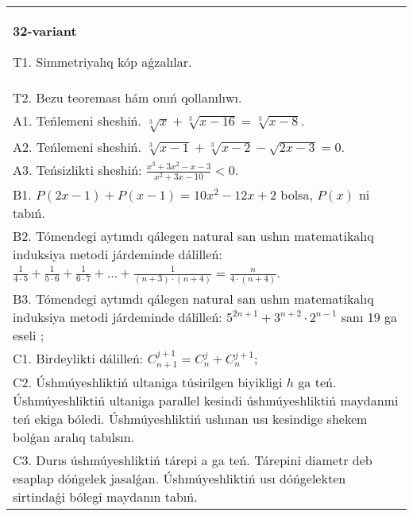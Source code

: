 \documentclass{article}
\begin{document}
\begin{tabular}{m{17cm}}
\textbf{32-variant}
\newline

T1. Simmetriyalıq kóp aǵzalılar. \\
T2. Bezu teoreması hám onıń qollanılıwı. \\
A1. Teńlemeni sheshiń. \(\sqrt[3]{x} + \sqrt[3]{x - 16} = \sqrt[3]{x - 8}\). \\
A2. Teńlemeni sheshiń. \(\sqrt[3]{x - 1} + \sqrt[3]{x - 2} - \sqrt{2x - 3} = 0\). \\
A3. Teńsizlikti sheshiń: \(\frac{x^{3} + 3x^{2} - x - 3}{x^{2} + 3x - 10} < 0\). \\
B1. \(P(2x - 1) + P(x - 1) = 10x^{2} - 12x + 2\) bolsa, \(P(x)\) ni tabıń. \\
B2. Tómendegi aytımdı qálegen natural san ushın matematikalıq induksiya metodi járdeminde dálilleń: \(\frac{1}{4 \cdot 5} + \frac{1}{5 \cdot 6} + \frac{1}{6 \cdot 7} + \ldots + \frac{1}{(n + 3) \cdot (n + 4)} = \frac{n}{4 \cdot (n + 4)}\). \\
B3. Tómendegi aytımdı qálegen natural san ushın matematikalıq induksiya metodi járdeminde dálilleń: \(5^{2n + 1} + 3^{n + 2} \cdot 2^{n - 1}\) sanı 19 ga eseli ; \\
C1. Birdeylikti dálilleń: \(C_{n + 1}^{j + 1} = C_{n}^{j} + C_{n}^{j + 1}\); \\
C2. Úshmúyeshliktiń ultaniga túsirilgen biyikligi \(h\) ga teń. Úshmúyeshliktiń ultaniga parallel kesindi úshmúyeshliktiń maydanıni teń ekiga bóledi. Úshmúyeshliktiń ushınan usı kesindige shekem bolǵan aralıq tabılsın. \\
C3. Durıs úshmúyeshliktiń tárepi a ga teń. Tárepini diametr deb esaplap dóńgelek jasalǵan. Úshmúyeshliktiń usı dóńgelekten sirtindaǵi bólegi maydanın tabıń. \\

\end{tabular}
\vspace{1cm}
\end{document}

